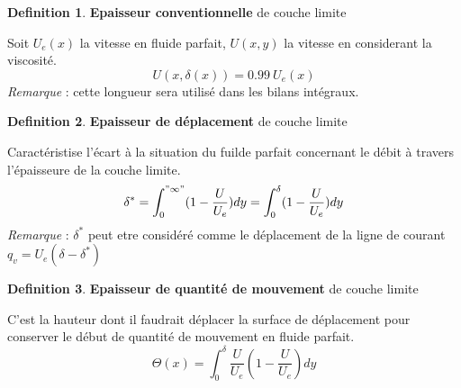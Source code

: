 \documentclass[french]{article}
\theoremstyle{definition}
\newtheorem{definition}{Definition}[section]
\begin{document}
\begin{definition} \textbf{Epaisseur conventionnelle} de couche limite \par
	Soit $ U_e(x) $ la vitesse en fluide parfait, $U(x,y)$ la vitesse en considerant la viscosité.
	$$ U(x,\delta(x)) = 0.99 \ U_e(x) $$
	\textit{Remarque} : cette longueur sera utilisé dans les bilans intégraux.
\end{definition}

\begin{definition} \textbf{Epaisseur de déplacement} de couche limite \par
	Caractéristise l'écart à la situation du fuilde parfait concernant le débit à travers l'épaisseure de la couche limite.
	$$ \delta ^{*} = \int_0^{"\infty"} (1 - \frac{U}{U_e}) dy = \int_0^{\delta} (1 - \frac{U}{U_e}) dy$$
	\textit{Remarque} : $\delta^{*}$ peut etre considéré comme le déplacement de la ligne de courant $q_v = U_e(\delta-\delta^{*})$
\end{definition}

\begin{definition} \textbf{Epaisseur de quantité de mouvement} de couche limite \par
	C'est la hauteur dont il faudrait déplacer la surface de déplacement pour conserver le début de quantité de mouvement en fluide parfait.
	$$ \Theta(x) = \int_0^{\delta} \frac{U}{U_e} (1-\frac{U}{U_e}) dy $$
\end{definition}
\end{document}
